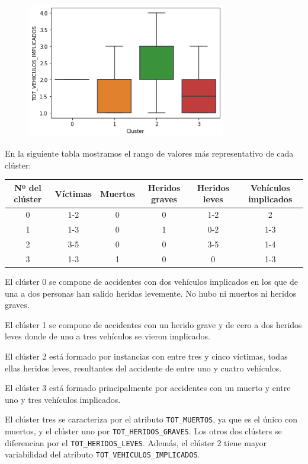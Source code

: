 \documentclass[a4]{article}
\begin{document}
\begin{figure}[H]
  \includegraphics[width=87mm]{imagenes/c3_kmeans_vi}
\end{figure}

\newpage
En la siguiente tabla mostramos el rango de valores más representativo de cada clúster:

\begin{center}
\begin{tabular}{|c|c|c|c|c|c|}
\hline
\multicolumn{1}{|c|}{\textbf{Nº del clúster}} & \textbf{Víctimas} & \textbf{Muertos} & \textbf{Heridos graves} & \textbf{Heridos leves} & \textbf{Vehículos implicados}\\ \hline
  0  & 1-2 & 0 & 0 & 1-2 & 2   \\ \hline
  1  & 1-3 & 0 & 1 & 0-2 & 1-3 \\ \hline
  2  & 3-5 & 0 & 0 & 3-5 & 1-4 \\ \hline
  3  & 1-3 & 1 & 0 & 0   & 1-3 \\ \hline
\end{tabular}
\end{center}

El clúster 0 se compone de accidentes con dos vehículos implicados en los que de una a dos personas han salido heridas levemente. No hubo ni muertos ni heridos graves.

El clúster 1 se compone de accidentes con un herido grave y de cero a dos heridos leves donde de uno a tres vehículos se vieron implicados.

El clúster 2 está formado por instancias con entre tres y cinco víctimas, todas ellas heridos leves, resultantes del accidente de entre uno y cuatro vehículos.

El clúster 3 está formado principalmente por accidentes con un muerto y entre uno y tres vehículos implicados.

El clúster tres se caracteriza por el atributo \texttt{TOT\_MUERTOS}, ya que es el único con muertos, y el clúster uno por \texttt{TOT\_HERIDOS\_GRAVES}. Los otros dos clústers se diferencian por el \texttt{TOT\_HERIDOS\_LEVES}. Además, el clúster 2 tiene mayor variabilidad del atributo \texttt{TOT\_VEHICULOS\_IMPLICADOS}.
\end{document}
